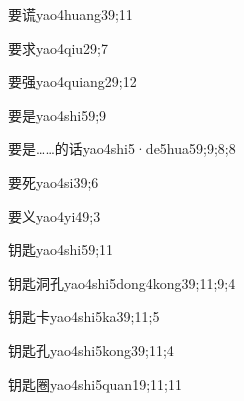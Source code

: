 \begin{verbete}{要谎}{yao4huang3}{9;11}
\end{verbete}

\begin{verbete}{要求}{yao4qiu2}{9;7}
\end{verbete}

\begin{verbete}{要强}{yao4quiang2}{9;12}
\end{verbete}

\begin{verbete}{要是}{yao4shi5}{9;9}
\end{verbete}

\begin{verbete}{要是……的话}{yao4shi5·de5hua5}{9;9;8;8}
\end{verbete}

\begin{verbete}{要死}{yao4si3}{9;6}
\end{verbete}

\begin{verbete}{要义}{yao4yi4}{9;3}
\end{verbete}

\begin{verbete}{钥匙}{yao4shi5}{9;11}
\end{verbete}

\begin{verbete}{钥匙洞孔}{yao4shi5dong4kong3}{9;11;9;4}
\end{verbete}

\begin{verbete}{钥匙卡}{yao4shi5ka3}{9;11;5}
\end{verbete}

\begin{verbete}{钥匙孔}{yao4shi5kong3}{9;11;4}
\end{verbete}

\begin{verbete}{钥匙圈}{yao4shi5quan1}{9;11;11}
\end{verbete}

